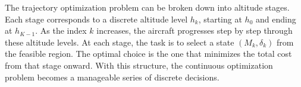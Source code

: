 
The trajectory optimization problem can be broken down into altitude stages. Each stage corresponds to a discrete altitude level $h_k$, starting at $h_0$ and ending at $h_{K-1}$. As the index $k$ increases, the aircraft progresses step by step through these altitude levels.
At each stage, the task is to select a state $(M_k, \delta_k)$ from the feasible region. The optimal choice is the one that minimizes the total cost from that stage onward. With this structure, the continuous optimization problem becomes a manageable series of discrete decisions.
